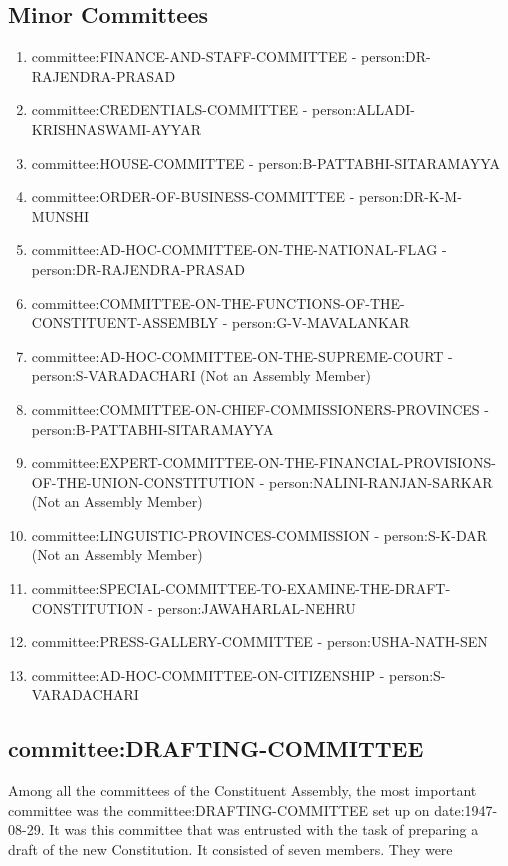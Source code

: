 \begin{multicol}{2}
\subsection{Minor Committees}

\begin{enumerate}
  \item \gls{committee:FINANCE-AND-STAFF-COMMITTEE} - \gls{person:DR-RAJENDRA-PRASAD}
  \item \gls{committee:CREDENTIALS-COMMITTEE} - \gls{person:ALLADI-KRISHNASWAMI-AYYAR}
  \item \gls{committee:HOUSE-COMMITTEE} - \gls{person:B-PATTABHI-SITARAMAYYA}
  \item \gls{committee:ORDER-OF-BUSINESS-COMMITTEE} - \gls{person:DR-K-M-MUNSHI}
  \item \gls{committee:AD-HOC-COMMITTEE-ON-THE-NATIONAL-FLAG} - \gls{person:DR-RAJENDRA-PRASAD}
  \item \gls{committee:COMMITTEE-ON-THE-FUNCTIONS-OF-THE-CONSTITUENT-ASSEMBLY} - \gls{person:G-V-MAVALANKAR}
  \item \gls{committee:AD-HOC-COMMITTEE-ON-THE-SUPREME-COURT} - \gls{person:S-VARADACHARI} (Not an Assembly Member)
  \item \gls{committee:COMMITTEE-ON-CHIEF-COMMISSIONERS-PROVINCES} - \gls{person:B-PATTABHI-SITARAMAYYA}
  \item \gls{committee:EXPERT-COMMITTEE-ON-THE-FINANCIAL-PROVISIONS-OF-THE-UNION-CONSTITUTION} - \gls{person:NALINI-RANJAN-SARKAR} (Not an Assembly Member)
  \item \gls{committee:LINGUISTIC-PROVINCES-COMMISSION} - \gls{person:S-K-DAR} (Not an Assembly Member)
  \item \gls{committee:SPECIAL-COMMITTEE-TO-EXAMINE-THE-DRAFT-CONSTITUTION} - \gls{person:JAWAHARLAL-NEHRU}
  \item \gls{committee:PRESS-GALLERY-COMMITTEE} - \gls{person:USHA-NATH-SEN}
  \item \gls{committee:AD-HOC-COMMITTEE-ON-CITIZENSHIP} - \gls{person:S-VARADACHARI}
\end{enumerate}


\subsection{\gls{committee:DRAFTING-COMMITTEE}}

Among all the committees of the Constituent Assembly, the most important committee was the \gls{committee:DRAFTING-COMMITTEE} set up on \gls{date:1947-08-29}. It was this committee that was entrusted with the task of preparing a draft of the new Constitution. It consisted of seven members. They were


\end{multicol}
